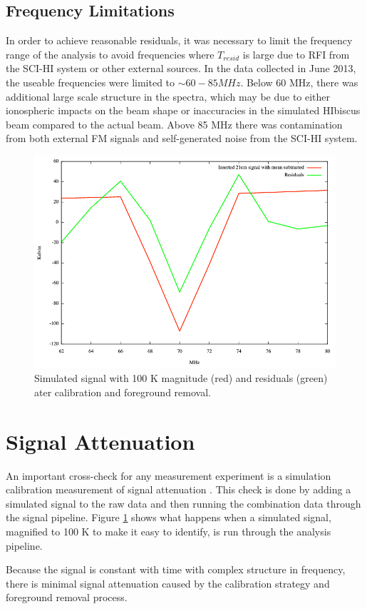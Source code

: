 \subsection{Frequency Limitations}
In order to achieve reasonable residuals, it was necessary to limit the frequency range of the analysis to avoid frequencies where $T_{resid}$ is large due to RFI from the SCI-HI system or other external sources. In the data collected in June 2013, the useable frequencies were limited to $\sim 60-85 MHz$. Below 60 MHz, there was additional large scale structure in the spectra, which may be due to either ionospheric impacts on the beam shape or inaccuracies in the simulated HIbiscus beam compared to the actual beam. Above 85 MHz there was contamination from both external FM signals and self-generated noise from the SCI-HI system. 

\begin{figure}[htb]
\begin{center}
\includegraphics[width=0.9\linewidth]{Data_analysis/figures/100_K_21cm_signal.png}
\caption{Simulated \cm signal with 100 K magnitude (red) and residuals (green) ater calibration and foreground removal. }
\label{Fig:100K_sim}
\end{center}
\end{figure}

\section{\cm Signal Attenuation}
An important cross-check for any \cm measurement experiment is a simulation calibration measurement of signal attenuation \cite{paciga_2013}. This check is done by adding a simulated \cm signal to the raw data and then running the combination data through the signal pipeline. Figure \ref{Fig:100K_sim} shows what happens when a simulated \cm signal, magnified to 100 K to make it easy to identify, is run through the analysis pipeline. 

Because the \cm signal is constant with time with complex structure in frequency, there is minimal signal attenuation caused by the calibration strategy and foreground removal process. 


